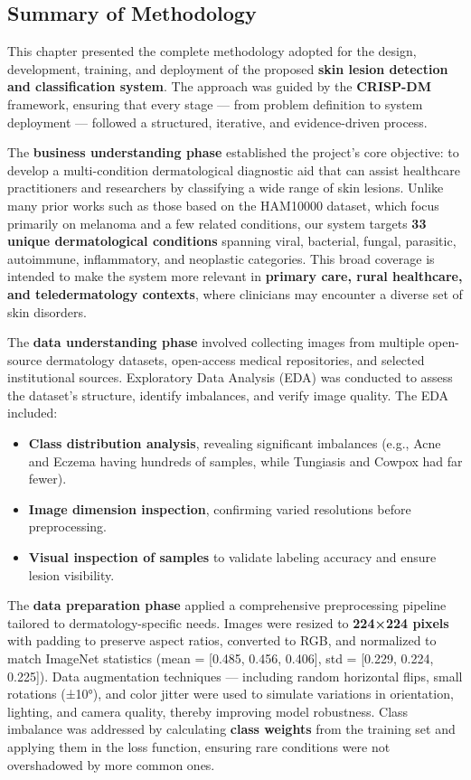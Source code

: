 \documentclass[
  12pt,
  oneside]{article}
\providecommand{\tightlist}{%
  \setlength{\itemsep}{0pt}\setlength{\parskip}{0pt}}
\begin{document}
\subsection{Summary of Methodology}\label{summary-of-methodology}

This chapter presented the complete methodology adopted for the design,
development, training, and deployment of the proposed \textbf{skin
lesion detection and classification system}. The approach was guided by
the \textbf{CRISP-DM} framework, ensuring that every stage --- from
problem definition to system deployment --- followed a structured,
iterative, and evidence-driven process.

The \textbf{business understanding phase} established the project's core
objective: to develop a multi-condition dermatological diagnostic aid
that can assist healthcare practitioners and researchers by classifying
a wide range of skin lesions. Unlike many prior works such as those
based on the HAM10000 dataset, which focus primarily on melanoma and a
few related conditions, our system targets \textbf{33 unique
dermatological conditions} spanning viral, bacterial, fungal, parasitic,
autoimmune, inflammatory, and neoplastic categories. This broad coverage
is intended to make the system more relevant in \textbf{primary care,
rural healthcare, and teledermatology contexts}, where clinicians may
encounter a diverse set of skin disorders.

The \textbf{data understanding phase} involved collecting images from
multiple open-source dermatology datasets, open-access medical
repositories, and selected institutional sources. Exploratory Data
Analysis (EDA) was conducted to assess the dataset's structure, identify
imbalances, and verify image quality. The EDA included:

\begin{itemize}
\tightlist
\item
  \textbf{Class distribution analysis}, revealing significant imbalances
  (e.g., Acne and Eczema having hundreds of samples, while Tungiasis and
  Cowpox had far fewer).
\item
  \textbf{Image dimension inspection}, confirming varied resolutions
  before preprocessing.
\item
  \textbf{Visual inspection of samples} to validate labeling accuracy
  and ensure lesion visibility.
\end{itemize}

The \textbf{data preparation phase} applied a comprehensive
preprocessing pipeline tailored to dermatology-specific needs. Images
were resized to \textbf{224×224 pixels} with padding to preserve aspect
ratios, converted to RGB, and normalized to match ImageNet statistics
(mean = {[}0.485, 0.456, 0.406{]}, std = {[}0.229, 0.224, 0.225{]}).
Data augmentation techniques --- including random horizontal flips,
small rotations (±10°), and color jitter were used to simulate
variations in orientation, lighting, and camera quality, thereby
improving model robustness. Class imbalance was addressed by calculating
\textbf{class weights} from the training set and applying them in the
loss function, ensuring rare conditions were not overshadowed by more
common ones.
\end{document}
